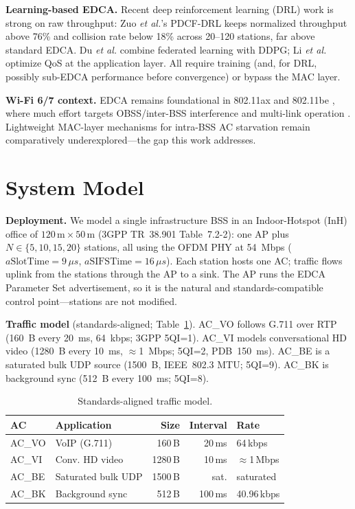 \documentclass[conference]{IEEEtran}
\newcommand{\AC}[1]{AC\_#1}
\begin{document}
\textbf{Learning-based EDCA.} Recent deep reinforcement learning (DRL) work is
strong on raw throughput: Zuo \emph{et al.}'s PDCF-DRL \cite{zuo} keeps
normalized throughput above 76\% and collision rate below 18\% across 20--120
stations, far above standard EDCA. Du
\emph{et al.} \cite{du} combine federated learning with DDPG; Li \emph{et al.}
\cite{li} optimize QoS at the application layer. All require training (and,
for DRL, possibly sub-EDCA performance before convergence) or bypass the MAC
layer.

\textbf{Wi-Fi 6/7 context.} EDCA remains foundational in 802.11ax \cite{ax}
and 802.11be \cite{yi}, where much effort targets OBSS/inter-BSS interference
and multi-link operation \cite{tuan}. Lightweight MAC-layer mechanisms for
intra-BSS AC starvation remain comparatively underexplored---the gap this work
addresses.

\section{System Model}\label{sec:model}
\textbf{Deployment.} We model a single infrastructure BSS in an Indoor-Hotspot
(InH) office of $120\,\text{m}\times50\,\text{m}$ (3GPP TR~38.901
Table~7.2-2): one AP plus $N\in\{5,10,15,20\}$ stations, all using the OFDM
PHY at 54~Mbps ($a\text{SlotTime}=9\,\mu s$, $a\text{SIFSTime}=16\,\mu s$).
Each station hosts one AC; traffic flows uplink from the stations through the
AP to a sink. The AP runs the EDCA Parameter Set advertisement, so it is the
natural and standards-compatible control point---stations are not modified.

\textbf{Traffic model} (standards-aligned; Table~\ref{tab:traffic}). \AC{VO}
follows G.711 over RTP (160~B every 20~ms, 64~kbps; 3GPP 5QI=1).
\AC{VI} models conversational HD video (1280~B every 10~ms,
$\approx$1~Mbps; 5QI=2, PDB~150~ms). \AC{BE} is a saturated bulk UDP source
(1500~B, IEEE~802.3 MTU; 5QI=9). \AC{BK} is background sync (512~B every
100~ms; 5QI=8).

\begin{table}[t]
\centering
\caption{Standards-aligned traffic model.}
\label{tab:traffic}
\begin{tabular}{@{}llrrl@{}}
\toprule
AC & Application & Size & Interval & Rate\\
\midrule
\AC{VO} & VoIP (G.711)        & 160\,B  & 20\,ms  & 64\,kbps\\
\AC{VI} & Conv. HD video      & 1280\,B & 10\,ms  & $\approx$1\,Mbps\\
\AC{BE} & Saturated bulk UDP  & 1500\,B & sat.    & saturated\\
\AC{BK} & Background sync      & 512\,B  & 100\,ms & 40.96\,kbps\\
\bottomrule
\end{tabular}
\end{table}
\end{document}

